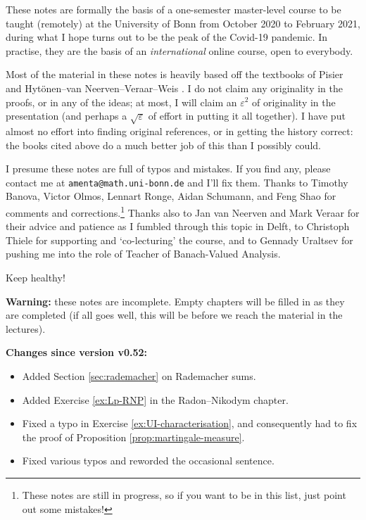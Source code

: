 These notes are formally the basis of a one-semester master-level course to be taught (remotely) at the University of Bonn from October 2020 to February 2021, during what I hope turns out to be the peak of the Covid-19 pandemic.
In practise, they are the basis of an \emph{international} online course, open to everybody.

Most of the material in these notes is heavily based off the textbooks of Pisier \cite{gP16} and Hyt\"onen--van Neerven--Veraar--Weis \cite{HNVW16, HNVW17}.
I do not claim any originality in the proofs, or in any of the ideas; at most, I will claim an $\varepsilon^2$ of originality in the presentation (and perhaps a $\sqrt{\varepsilon}$ of effort in putting it all together).
I have put almost no effort into finding original references, or in getting the history correct: the books cited above do a much better job of this than I possibly could.

\vspace{1cm}

I presume these notes are full of typos and mistakes.
If you find any, please contact me at \texttt{amenta@math.uni-bonn.de} and I'll fix them.
Thanks to Timothy Banova, Victor Olmos, Lennart Ronge, Aidan Schumann, and Feng Shao for comments and corrections.\footnote{These notes are still in progress, so if you want to be in this list, just point out some mistakes!}
Thanks also to Jan van Neerven and Mark Veraar for their advice and patience as I fumbled through this topic in Delft, to Christoph Thiele for supporting and `co-lecturing' the course, and to Gennady Uraltsev for pushing me into the role of Teacher of Banach-Valued Analysis.

\vspace{0.5cm}

Keep healthy! 




\vspace{1cm}

\textbf{Warning:} these notes are incomplete.
Empty chapters will be filled in as they are completed (if all goes well, this will be before we reach the material in the lectures).

\textbf{Changes since version v0.52:}
\begin{itemize}
\item Added Section \ref{sec:rademacher} on Rademacher sums.
\item Added Exercise \ref{ex:Lp-RNP} in the Radon--Nikodym chapter.
\item Fixed a typo in Exercise \ref{ex:UI-characterisation}, and consequently had to fix the proof of Proposition \ref{prop:martingale-measure}.
\item Fixed various typos and reworded the occasional sentence.
\end{itemize}

